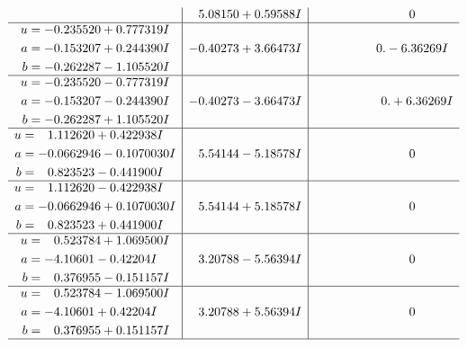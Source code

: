 \documentclass[1p]{elsarticle_modified}
\theoremstyle{definition}
\begin{document}
$$\begin{array}{c|c|c}
 & \phantom{-}5.08150 + 0.59588 I & \phantom{-0.000000 } 0 \\ \hline\begin{aligned}
u &= -0.235520 + 0.777319 I \\
a &= -0.153207 + 0.244390 I \\
b &= -0.262287 - 1.105520 I\end{aligned}
 & -0.40273 + 3.66473 I & \phantom{-0.000000 } 0. - 6.36269 I \\ \hline\begin{aligned}
u &= -0.235520 - 0.777319 I \\
a &= -0.153207 - 0.244390 I \\
b &= -0.262287 + 1.105520 I\end{aligned}
 & -0.40273 - 3.66473 I & \phantom{-0.000000 -}0. + 6.36269 I \\ \hline\begin{aligned}
u &= \phantom{-}1.112620 + 0.422938 I \\
a &= -0.0662946 - 0.1070030 I \\
b &= \phantom{-}0.823523 - 0.441900 I\end{aligned}
 & \phantom{-}5.54144 - 5.18578 I & \phantom{-0.000000 } 0 \\ \hline\begin{aligned}
u &= \phantom{-}1.112620 - 0.422938 I \\
a &= -0.0662946 + 0.1070030 I \\
b &= \phantom{-}0.823523 + 0.441900 I\end{aligned}
 & \phantom{-}5.54144 + 5.18578 I & \phantom{-0.000000 } 0 \\ \hline\begin{aligned}
u &= \phantom{-}0.523784 + 1.069500 I \\
a &= -4.10601 - 0.42204 I \\
b &= \phantom{-}0.376955 - 0.151157 I\end{aligned}
 & \phantom{-}3.20788 - 5.56394 I & \phantom{-0.000000 } 0 \\ \hline\begin{aligned}
u &= \phantom{-}0.523784 - 1.069500 I \\
a &= -4.10601 + 0.42204 I \\
b &= \phantom{-}0.376955 + 0.151157 I\end{aligned}
 & \phantom{-}3.20788 + 5.56394 I & \phantom{-0.000000 } 0\\
 \hline 
 \end{array}$$\newpage$$\begin{array}{c|c|c}  

\end{array}$$
\end{document}
